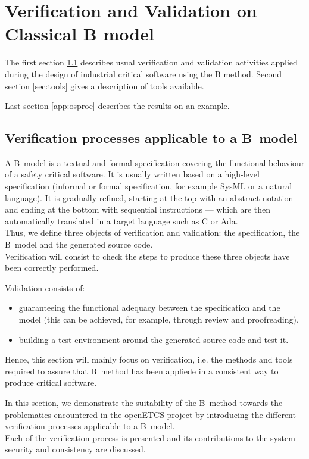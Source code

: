 \section{Verification and Validation on Classical B model}

The first section \ref{sec:processes} describes usual verification and validation activities applied during the design of industrial critical software using the B method. Second section \ref{sec:tools} gives a description of tools available.

Last section \ref{app:osproc} describes the results on an example.


\subsection{Verification processes applicable to a B~model}
\label{sec:processes}

A B~model is a textual and formal specification covering the functional behaviour of a safety critical software. It is usually written based on a high-level specification (informal or formal specification, for example SysML or a natural language). It is gradually refined, starting at the top with an abstract notation and ending at the bottom with sequential instructions --- which are then automatically translated in a target language such as C or Ada.\\
Thus, we define three objects of verification and validation: the specification, the B~model and the generated source code.\\

Verification will consist to  check the steps to produce these three objects have been correctly performed.

Validation consists of:
\begin{itemize}
\item guaranteeing the functional adequacy between the specification and the model (this can be achieved, for example, through review and proofreading),
\item building a test environment around the generated source code and test it.
\end{itemize}
Hence, this section will mainly focus on verification, i.e. the methods and tools required to assure that B~method has been appliede in a consistent way to produce critical software.

In this section, we demonstrate the suitability of the B~method towards the problematics encountered in the openETCS project by introducing the different verification processes applicable to a B~model.\\
Each of the verification process is presented and its contributions to the system security and consistency are discussed.

